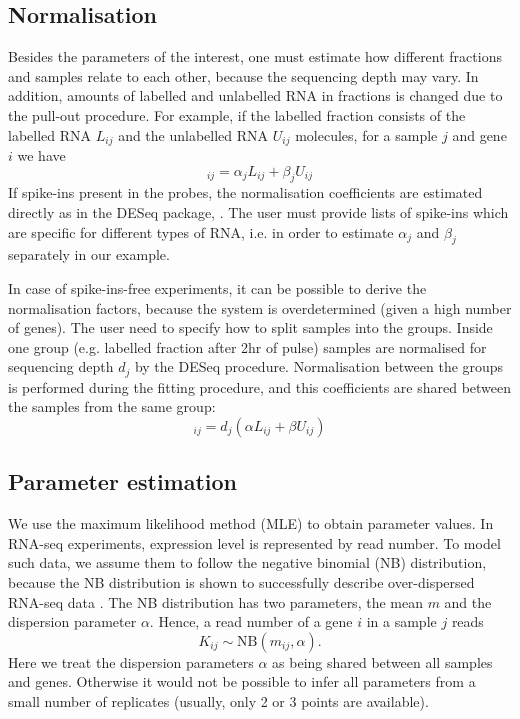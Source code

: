 \subsection{Normalisation}
Besides the parameters of the interest, one must estimate how different fractions
and samples relate to each other, because  the sequencing depth may vary.
In addition, amounts of labelled and unlabelled RNA in fractions is  changed due to 
the pull-out procedure. 
 For example, 
if the labelled fraction consists of the labelled RNA $L_{ij}$ and the unlabelled RNA
 $U_{ij}$ molecules, for a sample $j$ and gene $i$ we have 
\begin{equation}
 [\text{labelled fraction}]_{ij}  = \alpha_{j} L_{ij} + \beta_{j} U_{ij}
\end{equation}
If spike-ins present in the probes, the normalisation coefficients 
are estimated directly as in the DESeq package, \citet{anders2010differential}. 
The user must provide lists of spike-ins which are  specific for different types of RNA, 
i.e. in order to estimate $\alpha_j$ and $\beta_j$ separately in our example.
\par
In case of spike-ins-free experiments, 
it can be possible to derive the normalisation factors, 
because the system is overdetermined (given a high number of genes).
The user need to specify how to split samples into the groups.
Inside one group (e.g. labelled fraction after 2hr of pulse) samples are normalised for sequencing depth $d_j$ by
the DESeq procedure.
Normalisation between the groups is performed during the fitting procedure, 
and this coefficients are shared between the samples from the same group:
\begin{equation}
 [\text{labelled fraction}]_{ij}  = d_j(\alpha L_{ij} + \beta U_{ij})
\end{equation}

\subsection*{Parameter estimation}
We use the maximum likelihood method (MLE) to obtain parameter values.
In RNA-seq experiments, expression level is represented by read number.
To model such data, we assume them to follow the negative binomial (NB) distribution, 
because the NB distribution is  shown to successfully describe over-dispersed RNA-seq data 
\citep{robinson2007moderated}.
The NB distribution has two parameters, the mean $m$ and the dispersion parameter 
$\alpha$.
Hence,  a read number of a gene $i$ in a sample $j$ reads
\begin{equation}
 K_{ij} \sim \text{NB}(m_{ij}, \alpha).
\end{equation}
Here we treat the  dispersion parameters $\alpha$ as  being shared between all
samples and genes. Otherwise it would not be possible to infer all parameters 
from a small number of replicates (usually, only 2 or 3 points are available).


